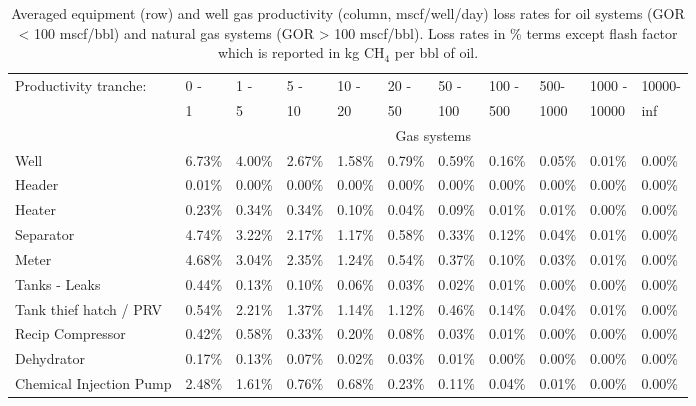 \documentclass[11pt]{report}
\begin{document}
\begin{landscape}
\begin{table}
\begin{scriptsize}
\caption{Averaged equipment (row) and well gas productivity (column, mscf/well/day) loss rates for oil systems (GOR < 100 mscf/bbl) and natural gas systems (GOR > 100 mscf/bbl). Loss rates in \% terms except flash factor which is reported in kg CH$_4$ per bbl of oil.}
\label{tab:tranche_VF_EFs}
\begin{threeparttable}
\begin{tabular}{lllllllllll}
\toprule
Productivity tranche:    	& 0 -  & 1 -     & 5 - & 10 - & 20 - & 50 - & 100 - & 500- & 1000 - & 10000- \\
                        			& 1       & 5     & 10     & 20      & 50      & 100     & 500      & 1000     & 10000     & inf        \\
			                        & \multicolumn{10}{c}{Gas systems}       \\ 
			\midrule
Well                    & 6.73\%  & 4.00\%  & 2.67\%  & 1.58\% & 0.79\% & 0.59\% & 0.16\% & 0.05\% & 0.01\% & 0.00\%  \\
Header                  & 0.01\%  & 0.00\%  & 0.00\%  & 0.00\% & 0.00\% & 0.00\% & 0.00\% & 0.00\% & 0.00\% & 0.00\%  \\
Heater                  & 0.23\%  & 0.34\%  & 0.34\%  & 0.10\% & 0.04\% & 0.09\% & 0.01\% & 0.01\% & 0.00\% & 0.00\%  \\
Separator               & 4.74\%  & 3.22\%  & 2.17\%  & 1.17\% & 0.58\% & 0.33\% & 0.12\% & 0.04\% & 0.01\% & 0.00\%  \\
Meter                   & 4.68\%  & 3.04\%  & 2.35\%  & 1.24\% & 0.54\% & 0.37\% & 0.10\% & 0.03\% & 0.01\% & 0.00\%  \\
Tanks - Leaks           & 0.44\%  & 0.13\%  & 0.10\%  & 0.06\% & 0.03\% & 0.02\% & 0.01\% & 0.00\% & 0.00\% & 0.00\%  \\
Tank thief hatch / PRV  & 0.54\%  & 2.21\%  & 1.37\%  & 1.14\% & 1.12\% & 0.46\% & 0.14\% & 0.04\% & 0.01\% & 0.00\%  \\
Recip Compressor        & 0.42\%  & 0.58\%  & 0.33\%  & 0.20\% & 0.08\% & 0.03\% & 0.01\% & 0.00\% & 0.00\% & 0.00\%  \\
Dehydrator              & 0.17\%  & 0.13\%  & 0.07\%  & 0.02\% & 0.03\% & 0.01\% & 0.00\% & 0.00\% & 0.00\% & 0.00\%  \\
Chemical Injection Pump & 2.48\%  & 1.61\%  & 0.76\%  & 0.68\% & 0.23\% & 0.11\% & 0.04\% & 0.01\% & 0.00\% & 0.00\%  \\

\end{tabular}
\end{threeparttable}
\end{scriptsize}
\end{table}
\end{landscape}
\end{document}
